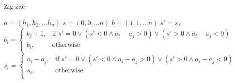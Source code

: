 \documentclass{article}
\begin{document}
\begin{algorithm}
\caption{Zig-zac}\label{euclid}
\begin{algorithmic}[1]
\State $a = (h_1, h_2,...h_n)$
\State $s = (0, 0,...n)$
\State $b = (1, 1,...n)$
\State $s' = s_j$
\State $b_i = \begin{cases}
                b_j +1, & \mbox{if } s' = 0 \vee (s' < 0 \wedge a_i - a_j > 0) \vee (s' > 0 \wedge a_i - a_j < 0) \\
                b_i, & \mbox{otherwise }  \\
                \end{cases}$
\State $s_i = \begin{cases}
                a_i - a_j, & \mbox{if } s' = 0 \vee (s' < 0 \wedge a_i - a_j > 0) \vee (s' > 0 \wedge a_i - a_j < 0) \\
                s_i, & \mbox{otherwise }  \\
                \end{cases}$
\EndFor
\EndFor
\end{algorithmic}
\end{algorithm}
\end{document}
